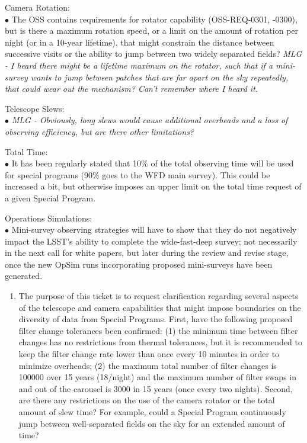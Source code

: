 \documentclass[DM,lsstdraft,toc]{lsstdoc}
\begin{document}
Camera Rotation: \\
$\bullet$ The OSS contains requirements for rotator capability (OSS-REQ-0301, -0300), but is there a maximum rotation speed, or a limit on the amount of rotation per night (or in a 10-year lifetime), that might constrain the distance between successive visits or the ability to jump between two widely separated fields? \textit{MLG - I heard there might be a lifetime maximum on the rotator, such that if a mini-survey wants to jump between patches that are far apart on the sky repeatedly, that could wear out the mechanism? Can't remember where I heard it.}

Telescope Slews: \\
$\bullet$ \textit{MLG - Obviously, long slews would cause additional overheads and a loss of observing efficiency, but are there other limitations?}

Total Time: \\
$\bullet$ It has been regularly stated that 10\% of the total observing time will be used for special programs (90\% goes to the WFD main survey). This could be increased a bit, but otherwise imposes an upper limit on the total time request of a given Special Program.

Operations Simulations: \\
$\bullet$ Mini-survey observing strategies will have to show that they do not negatively impact the LSST's ability to complete the wide-fast-deep survey; not necessarily in the next call for white papers, but later during the review and revise stage, once the new OpSim runs incorporating proposed mini-surveys have been generated.

\begin{enumerate}[resume,topsep=-10pt,after=\vspace{10pt},label= \textbf{Action \Roman*}] \item \label{Bounds-1} The purpose of this ticket is to request clarification regarding several aspects of the telescope and camera capabilities that might impose boundaries on the diversity of data from Special Programs. First, have the following proposed filter change tolerances been confirmed: (1) the minimum time between filter changes has no restrictions from thermal tolerances, but it is recommended to keep the filter change rate lower than once every 10 minutes in order to minimize overheads; (2) the maximum total number of filter changes is 100000 over 15 years (18/night) and the maximum number of filter swaps in and out of the carousel is 3000 in 15 years (once every two nights). Second, are there any restrictions on the use of the camera rotator or the total amount of slew time? For example, could a Special Program continuously jump between well-separated fields on the sky for an extended amount of time? \end{enumerate}
\end{document}
